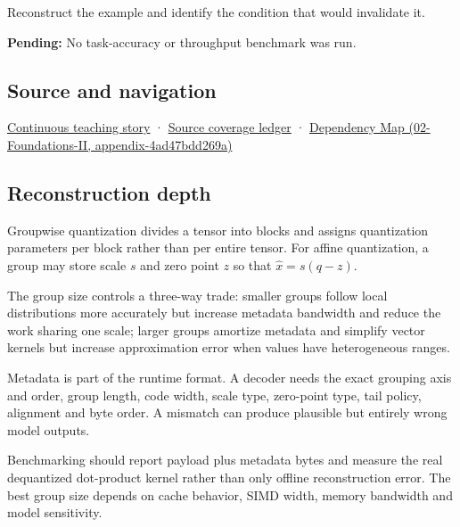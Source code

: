 Reconstruct the example and identify the condition that would invalidate it.

\textbf{Pending:} No task-accuracy or throughput benchmark was run.

\subsection{Source and navigation}\label{appendix-638204c40e8b-source-and-navigation}

\hyperref[01-foundations-i-ch001-choosing-what-information-to-keep]{Continuous teaching story} · \hyperref[appendix-fd090d982a15]{Source coverage ledger} · \href{../02-Foundations-II/main.pdf\#nameddest=appendix-4ad47bdd269a}{Dependency Map (02-Foundations-II, appendix-4ad47bdd269a)}

\subsection{Reconstruction depth}\label{appendix-638204c40e8b-reconstruction-depth}

Groupwise quantization divides a tensor into blocks and assigns quantization parameters per block rather than per entire tensor. For affine quantization, a group may store scale \(s\) and zero point \(z\) so that \(\hat x=s(q-z)\).

The group size controls a three-way trade: smaller groups follow local distributions more accurately but increase metadata bandwidth and reduce the work sharing one scale; larger groups amortize metadata and simplify vector kernels but increase approximation error when values have heterogeneous ranges.

Metadata is part of the runtime format. A decoder needs the exact grouping axis and order, group length, code width, scale type, zero-point type, tail policy, alignment and byte order. A mismatch can produce plausible but entirely wrong model outputs.

Benchmarking should report payload plus metadata bytes and measure the real dequantized dot-product kernel rather than only offline reconstruction error. The best group size depends on cache behavior, SIMD width, memory bandwidth and model sensitivity.
